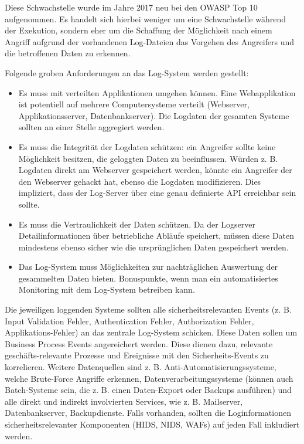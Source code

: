 Diese Schwachstelle wurde im Jahre 2017 neu bei den OWASP Top 10 aufgenommen. Es handelt sich hierbei weniger um eine Schwachstelle während der Exekution, sondern eher um die Schaffung der Möglichkeit nach einem Angriff aufgrund der vorhandenen Log-Dateien das Vorgehen des Angreifers und die betroffenen Daten zu erkennen.

Folgende groben Anforderungen an das Log-System werden gestellt:

\begin{itemize}
	\item Es muss mit verteilten Applikationen umgehen können. Eine Webapplikation ist potentiell auf mehrere Computersysteme verteilt (Webserver, Applikationsserver, Datenbankserver). Die Logdaten der gesamten Systeme sollten an einer Stelle aggregiert werden.
	\item Es muss die Integrität der Logdaten schützen: ein Angreifer sollte keine Möglichkeit besitzen, die geloggten Daten zu beeinflussen. Würden z. B. Logdaten direkt am Webserver gespeichert werden, könnte ein Angreifer der den Webserver gehackt hat, ebenso die Logdaten modifizieren. Dies impliziert, dass der Log-Server über eine genau definierte API erreichbar sein sollte.
	\item Es muss die Vertraulichkeit der Daten schützen. Da der Logserver Detailinformationen über betriebliche Abläufe speichert, müssen diese Daten mindestens ebenso sicher wie die ursprünglichen Daten gespeichert werden.
	\item Das Log-System muss Möglichkeiten zur nachträglichen Auswertung der gesammelten Daten bieten. Bonuspunkte, wenn man ein automatisiertes Monitoring mit dem Log-System betreiben kann.
\end{itemize}

Die jeweiligen loggenden Systeme sollten alle sicherheitsrelevanten Events (z. B. Input Validation Fehler, Authentication Fehler, Authorization Fehler, Applikations-Fehler) an das zentrale Log-System schicken. Diese Daten sollen um Business Process Events angereichert werden. Diese dienen dazu, relevante geschäfts-relevante Prozesse und Ereignisse mit den Sicherheits-Events zu korrelieren. Weitere Datenquellen sind z. B. Anti-Automatisierungssysteme, welche Brute-Force Angriffe erkennen, Datenverarbeitungssysteme (können auch Batch-Systeme sein, die z. B. einen Daten-Export oder Backups ausführen) und alle direkt und indirekt involvierten Services, wie z. B. Mailserver, Datenbankserver, Backupdienste. Falls vorhanden, sollten die Loginformationen sicherheitsrelevanter Komponenten (HIDS, NIDS, WAFs) auf jeden Fall inkludiert werden.

